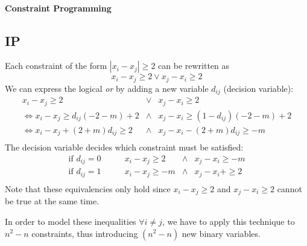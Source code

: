 \documentclass[a4paper, oneside]{scrartcl}
\begin{document}
\paragraph{Constraint Programming}

\subsection{IP}

Each constraint of the form $|x_i - x_j| \geq 2$ can be rewritten as
\[x_i - x_j \geq 2 \vee x_j - x_i \geq 2\]
We can express the logical \emph{or} by adding a 
new variable $d_{ij}$ (decision variable):
\[ \begin{array} {ccc}
x_i-x_j \geq 2 & \vee & x_j-x_i \geq 2 \\
\Leftrightarrow x_i - x_j \geq d_{ij}(-2-m) +2 &\wedge& x_j - x_i \geq (1-d_{ij})(-2-m) +2 \\
\Leftrightarrow x_i - x_j + (2+m)d_{ij} \geq 2 &\wedge& x_j - x_i - (2+m)d_{ij}\geq  -m \\
\end{array} \]
The decision variable decides which constraint must be satisfied: 
\[ \begin{array} {cccc}
\text{if } d_{ij} = 0 \qquad & x_i - x_j \geq 2 &\wedge& x_j - x_i \geq -m \\
\text{if } d_{ij} = 1 \qquad & x_i - x_j \geq -m &\wedge& x_j - x_i + \geq  2 \\
\end{array} \]
Note that these equivalencies only hold since $x_i-x_j \geq 2$ and $x_j-x_i \geq 2$ cannot be true at the same time.

In order to model these inequalities $\forall i\neq j$, we have to apply this technique to $n^2  -n$ constraints, 
thus introducing $(n^2-n)$ new binary variables.
\end{document}
